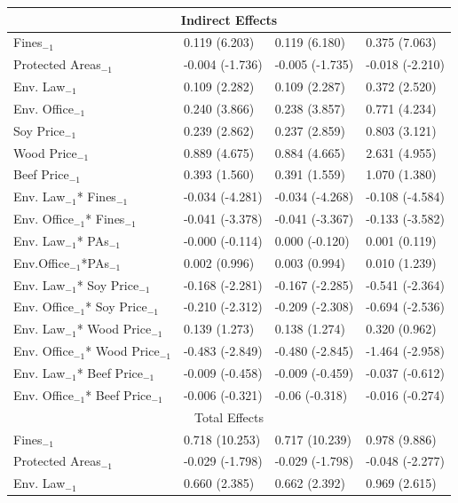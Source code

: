 \begin{table}[htpb!]
\begin{tabularx}{0.8\textwidth}{l XXX}
    \hline
    \multicolumn{4}{c}{Indirect Effects} \\ 
    \hline
    Fines$_{-1}$ & 0.119 (6.203) & 0.119 (6.180) & 0.375 (7.063)\\
    Protected Areas$_{-1}$ & -0.004 (-1.736) & -0.005  (-1.735) & -0.018 (-2.210)\\
    Env. Law$_{-1}$ &0.109 (2.282) & 0.109 (2.287) & 0.372 (2.520)\\
    Env. Office$_{-1}$ & 0.240 (3.866)& 0.238 (3.857) & 0.771 (4.234)\\
    Soy Price$_{-1}$ & 0.239 (2.862) & 0.237 (2.859) & 0.803 (3.121)\\
    Wood Price$_{-1}$ & 0.889 (4.675) & 0.884 (4.665) & 2.631 (4.955)\\
    Beef Price$_{-1}$& 0.393 (1.560) & 0.391 (1.559) & 1.070 (1.380)\\
    Env. Law$_{-1}$* Fines$_{-1}$& -0.034 (-4.281) & -0.034 (-4.268) & -0.108 (-4.584)\\
    Env. Office$_{-1}$* Fines$_{-1}$& -0.041 (-3.378) & -0.041 (-3.367) & -0.133 (-3.582)\\
    Env. Law$_{-1}$* PAs$_{-1}$	& -0.000 (-0.114)& 0.000 (-0.120) & 0.001 (0.119)\\
    Env.Office$_{-1}$*PAs$_{-1}$ & 0.002 (0.996) & 0.003 (0.994) & 0.010 (1.239)\\
    Env. Law$_{-1}$* Soy Price$_{-1}$ & -0.168 (-2.281) & -0.167 (-2.285) & -0.541 (-2.364)\\
    Env. Office$_{-1}$* Soy Price$_{-1}$ & -0.210 (-2.312) & -0.209 (-2.308) & -0.694 (-2.536)\\
    Env. Law$_{-1}$* Wood Price$_{-1}$ & 0.139 (1.273) & 0.138 (1.274) & 0.320 (0.962)\\
    Env. Office$_{-1}$* Wood Price$_{-1}$& -0.483 (-2.849) & -0.480 (-2.845) & -1.464 (-2.958)\\
    Env. Law$_{-1}$* Beef Price$_{-1}$ & -0.009 (-0.458) & -0.009 (-0.459) & -0.037 (-0.612)\\
    Env. Office$_{-1}$* Beef Price$_{-1}$& -0.006 (-0.321) & -0.06 (-0.318) & -0.016 (-0.274)\\
    \hline
    \multicolumn{4}{c}{Total Effects} \\ 
    \hline
    Fines$_{-1}$ & 0.718 (10.253) & 0.717 (10.239) & 0.978 (9.886) \\
    Protected Areas$_{-1}$ & -0.029 (-1.798) & -0.029 (-1.798) & -0.048 (-2.277)\\
    Env. Law$_{-1}$  &  0.660 (2.385) & 0.662 (2.392) & 0.969 (2.615)\\

\end{tabularx}
\end{table}
